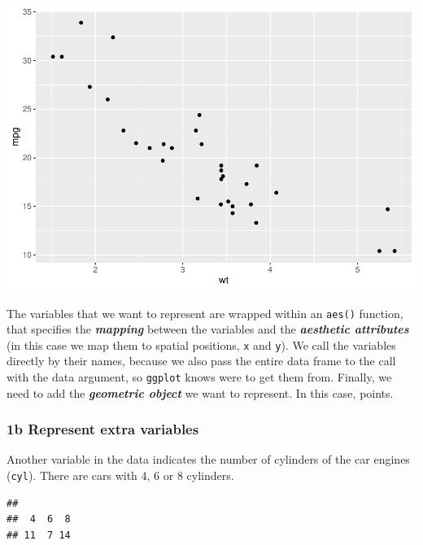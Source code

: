 \documentclass[
]{article}
\newenvironment{Shaded}{\begin{snugshade}}{\end{snugshade}}
\newcommand{\FunctionTok}[1]{\textcolor[rgb]{0.13,0.29,0.53}{\textbf{#1}}}
\newcommand{\NormalTok}[1]{#1}
\newcommand{\SpecialCharTok}[1]{\textcolor[rgb]{0.81,0.36,0.00}{\textbf{#1}}}
\begin{document}
\begin{center}\includegraphics{P1_exercises_files/figure-latex/scatter-ggplot2-1} \end{center}

The variables that we want to represent are wrapped within an
\texttt{aes()} function, that specifies the \textbf{\emph{mapping}}
between the variables and the \textbf{\emph{aesthetic attributes}} (in
this case we map them to spatial positions, \texttt{x} and \texttt{y}).
We call the variables directly by their names, because we also pass the
entire data frame to the call with the data argument, so \texttt{ggplot}
knows were to get them from. Finally, we need to add the
\textbf{\emph{geometric object}} we want to represent. In this case,
points.

\subsubsection{\texorpdfstring{\textbf{1b} \textbar{} Represent extra
variables}{1b \textbar{} Represent extra variables}}\label{b-represent-extra-variables}

Another variable in the data indicates the number of cylinders of the
car engines (\texttt{cyl}). There are cars with 4, 6 or 8 cylinders.

\begin{Shaded}
\end{Shaded}

\begin{verbatim}
## 
##  4  6  8 
## 11  7 14
\end{verbatim}
\end{document}
